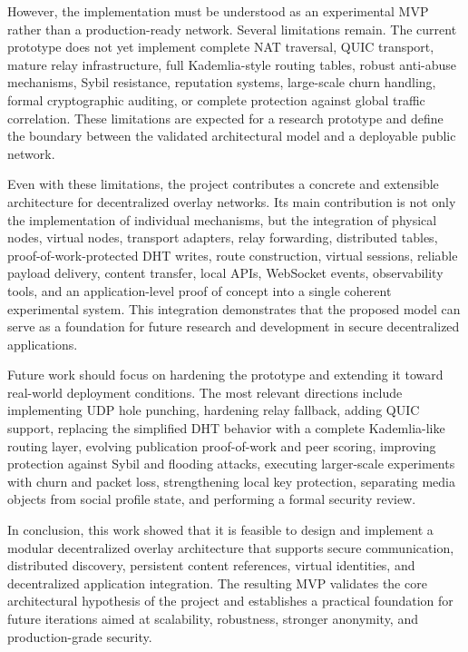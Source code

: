 \documentclass[12pt,a4paper]{article}
\begin{document}
However, the implementation must be understood as an experimental MVP rather than a production-ready network. Several limitations remain. The current prototype does not yet implement complete NAT traversal, QUIC transport, mature relay infrastructure, full Kademlia-style routing tables, robust anti-abuse mechanisms, Sybil resistance, reputation systems, large-scale churn handling, formal cryptographic auditing, or complete protection against global traffic correlation. These limitations are expected for a research prototype and define the boundary between the validated architectural model and a deployable public network.

Even with these limitations, the project contributes a concrete and extensible architecture for decentralized overlay networks. Its main contribution is not only the implementation of individual mechanisms, but the integration of physical nodes, virtual nodes, transport adapters, relay forwarding, distributed tables, proof-of-work-protected DHT writes, route construction, virtual sessions, reliable payload delivery, content transfer, local APIs, WebSocket events, observability tools, and an application-level proof of concept into a single coherent experimental system. This integration demonstrates that the proposed model can serve as a foundation for future research and development in secure decentralized applications.

Future work should focus on hardening the prototype and extending it toward real-world deployment conditions. The most relevant directions include implementing UDP hole punching, hardening relay fallback, adding QUIC support, replacing the simplified DHT behavior with a complete Kademlia-like routing layer, evolving publication proof-of-work and peer scoring, improving protection against Sybil and flooding attacks, executing larger-scale experiments with churn and packet loss, strengthening local key protection, separating media objects from social profile state, and performing a formal security review.

In conclusion, this work showed that it is feasible to design and implement a modular decentralized overlay architecture that supports secure communication, distributed discovery, persistent content references, virtual identities, and decentralized application integration. The resulting MVP validates the core architectural hypothesis of the project and establishes a practical foundation for future iterations aimed at scalability, robustness, stronger anonymity, and production-grade security.
\end{document}
